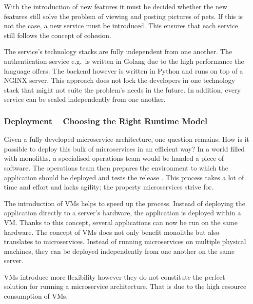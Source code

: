 With the introduction of new features it must be decided whether the new
features still solve the problem of viewing and posting pictures of pets. If
this is not the case, a new service must be introduced. This ensures that each
service still follows the concept of cohesion.

The service's technology stacks are fully independent from one another. The
authentication service e.g.\ is written in Golang due to the high performance
the language offers. The backend however is written in Python and runs on top
of a NGINX server. This approach does not lock the developers in one technology
stack that might not suite the problem's needs in the future. In addition,
every service can be scaled independently from one another.

\subsubsection{Deployment -- Choosing the Right Runtime Model}%
\label{ssub:Deployment_Runtime_Model}

Given a fully developed microservice architecture, one question remains: How is
it possible to deploy this bulk of microservices in an efficient way? In a
world filled with monoliths, a specialised operations team would be handed a
piece of software. The operations team then prepares the environment to which
the application should be deployed and tests the release
\autocite{VillamizarEvaluatingmonolithicmicroservice2015}. This process takes a
lot of time and effort and lacks agility; the property microservices strive
for.

The introduction of \acp{VM} helps to speed up the process. Instead of
deploying the application directly to a server's hardware, the application is
deployed within a \ac{VM}. Thanks to this concept, several applications can now
be run on the same hardware. The concept of \acp{VM} does not only benefit
monoliths but also translates to microservices. Instead of running
microservices on multiple physical machines, they can be deployed
independently from one another on the same server.

\acp{VM} introduce more flexibility however they do not constitute the perfect
solution for running a microservice architecture. That is due to the high
resource consumption of \acp{VM}.

